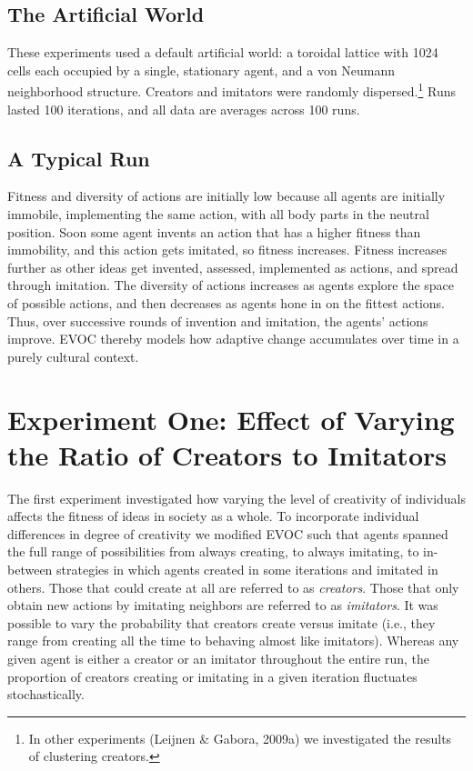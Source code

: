 \documentclass[a4paper,12pt,man,british]{apa6}
\begin{document}
\subsection{The Artificial World}
These experiments used a default artificial world: a toroidal lattice with 1024 cells each occupied by a single, stationary agent, and a von Neumann neighborhood structure. Creators and imitators were randomly dispersed.\footnote{In other experiments (Leijnen \& Gabora, 2009a) we investigated the results of clustering creators.} Runs lasted 100 iterations, and all data are averages across 100 runs.

\subsection{A Typical Run}
Fitness and diversity of actions are initially low because all agents are initially immobile, implementing the same action, with all body parts in the neutral position. Soon some agent invents an action that has a higher fitness than immobility, and this action gets imitated, so fitness increases. Fitness increases further as other ideas get invented, assessed, implemented as actions, and spread through imitation. The diversity of actions increases as agents explore the space of possible actions, and then decreases as agents hone in on the fittest actions. Thus, over successive rounds of invention and imitation, the agents' actions improve. EVOC thereby models how adaptive change accumulates over time in a purely cultural context. 

\section{Experiment One: Effect of Varying the Ratio of Creators to Imitators}

The first experiment investigated how varying the level of creativity of individuals affects the fitness of ideas in society as a whole. To incorporate individual differences in degree of creativity we modified EVOC such that agents spanned the full range of possibilities from always creating, to always imitating, to in-between strategies in which agents created in some iterations and imitated in others. Those that could create at all are referred to as \emph{creators}. Those that only obtain new actions by imitating neighbors are referred to as \emph{imitators}. It was possible to vary the probability that creators create versus imitate (i.e., they range from creating all the time to behaving almost like imitators). Whereas any given agent is either a creator or an imitator throughout the entire run, the proportion of creators creating or imitating in a given iteration fluctuates stochastically.
\end{document}
